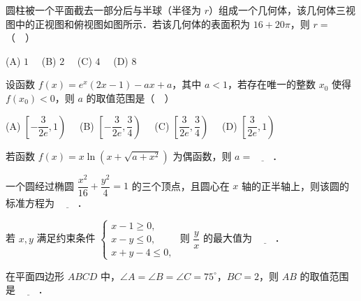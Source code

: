 \begin{question}
圆柱被一个平面截去一部分后与半球（半径为 $r$）组成一个几何体，该几何体三视图中的正视图和俯视图如图所示．若该几何体的表面积为 $16+20\pi$，则 $r=$（　）
\nopagebreak[4]
\begin{center}\end{center}
\nopagebreak[4]
\nopagebreak[4]
\begin{center}\end{center}
\nopagebreak[4]
(A) $1$　 (B) $2$　 (C) $4$　 (D) $8$

\end{question}
\begin{question}
设函数 $f(x)=e^x(2x-1)-ax+a$，其中 $a<1$，若存在唯一的整数 $x_0$ 使得 $f(x_0)<0$，则 $a$ 的取值范围是（　）

(A) $\left[-\dfrac{3}{2e},1\right)$　 (B) $\left[-\dfrac{3}{2e},\dfrac34\right)$　 (C) $\left[\dfrac{3}{2e},\dfrac34\right)$　 (D) $\left[\dfrac{3}{2e},1\right)$

\end{question}

\begin{question}
若函数 $f(x)=x\ln\!\left(x+\sqrt{a+x^2}\right)$ 为偶函数，则 $a=\underline{\qquad}$．

\end{question}
\begin{question}
一个圆经过椭圆 $\dfrac{x^2}{16}+\dfrac{y^2}{4}=1$ 的三个顶点，且圆心在 $x$ 轴的正半轴上，则该圆的标准方程为 $\underline{\qquad}$．

\end{question}
\begin{question}
若 $x,y$ 满足约束条件 $\begin{cases}x-1\geqslant0,\\x-y\leqslant0,\\x+y-4\leqslant0,\end{cases}$ 则 $\dfrac yx$ 的最大值为 $\underline{\qquad}$．

\end{question}
\begin{question}
在平面四边形 $ABCD$ 中，$\angle A=\angle B=\angle C=75^\circ$，$BC=2$，则 $AB$ 的取值范围是 $\underline{\qquad}$．

\end{question}

